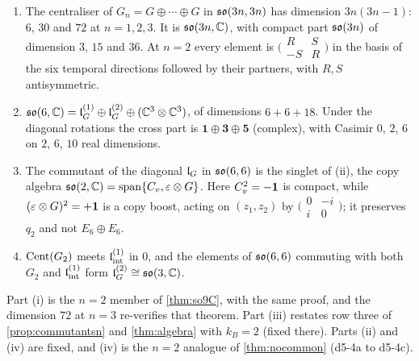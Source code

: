 \begin{proposition}[$\Cent(G_2)=\so{6,\C}$ and the copy algebra]
\label{d5:prop:so6C}
\begin{enumerate}[label=(\roman*),leftmargin=2.2em]
\item The centraliser of $G_n=G\oplus\cdots\oplus G$ in $\mathfrak{so}(3n,3n)$ has dimension $3n(3n-1)$: $6$, $30$ and $72$ at $n=1,2,3$. It is $\mathfrak{so}(3n,\mathbb{C})$, with
compact part $\mathfrak{so}(3n)$ of dimension $3$, $15$ and $36$. At $n=2$ every element is $\bigl(\begin{smallmatrix}R&S\\-S&R\end{smallmatrix}\bigr)$ in the
basis of the six temporal directions followed by their partners, with $R,S$ antisymmetric.
\item $\mathfrak{so}(6,\mathbb{C})=\mathfrak l_G^{(1)}\oplus\mathfrak l_G^{(2)}\oplus(\mathbb{C}^3\otimes\mathbb{C}^3)$, of dimensions $6+6+18$. Under the diagonal rotations the cross part is
$\mathbf1\oplus\mathbf3\oplus\mathbf5$ (complex), with Casimir $0$, $2$, $6$ on $2$, $6$, $10$ real dimensions.
\item The commutant of the diagonal $\mathfrak l_G$ in $\mathfrak{so}(6,6)$ is the singlet of (ii), the copy algebra $\mathfrak{so}(2,\mathbb{C})=\operatorname{span}\{C_v,\varepsilon\otimes G\}$. Here
$C_v^2=-\mathbf 1$ is compact, while $(\varepsilon\otimes G)^2=+\mathbf 1$ is a copy boost, acting on $(z_1,z_2)$ by $\bigl(\begin{smallmatrix}0&-i\\ i&0\end{smallmatrix}\bigr)$; it
preserves $q_2$ and not $E_6\oplus E_6$.
\item $\operatorname{Cent}(G_2)$ meets $\mathfrak l_{\rm int}^{(1)}$ in $0$, and the elements of $\mathfrak{so}(6,6)$ commuting with both $G_2$ and $\mathfrak l_{\rm int}^{(1)}$ form $\mathfrak l_G^{(2)}\cong\mathfrak{so}(3,\mathbb{C})$.
\end{enumerate}
\end{proposition}

Part (i) is the $n=2$ member of \cref{thm:so9C}, with the same proof, and the dimension $72$ at $n=3$ re-verifies that theorem.
Part (iii) restates row three of \cref{prop:commutantsn} and \cref{thm:algebra} with $k_B=2$ (fixed there). Parts (ii) and (iv) are fixed,
and (iv) is the $n=2$ analogue of \cref{thm:nocommon} (d5-4a to d5-4c).

